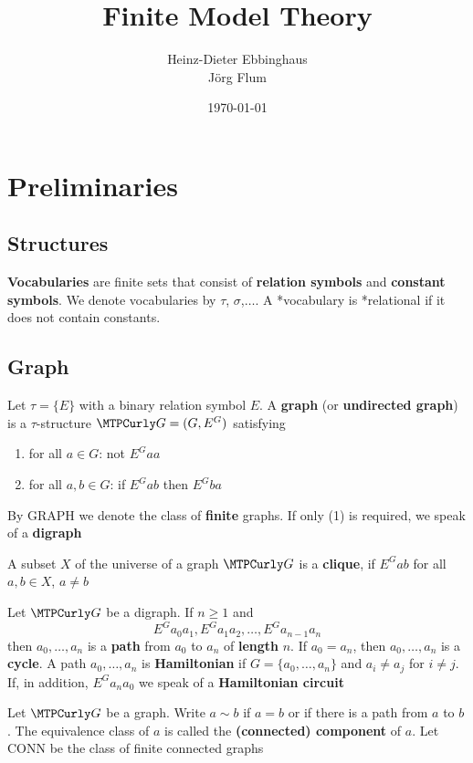 \documentclass[11pt]{article}
\author{Heinz-Dieter Ebbinghaus\\Jörg Flum}
\date{\today}
\title{Finite Model Theory}
\begin{document}
\maketitle
\tableofcontents \clearpage

\section{Preliminaries}
\label{sec:org5835688}

\subsection{Structures}
\label{sec:orgeb2f0cf}
\textbf{Vocabularies} are finite sets that consist of \textbf{relation symbols} and
\textbf{constant symbols}. We denote vocabularies by \(\tau\), \(\sigma\),\(\dots\). A
*vocabulary is *relational if it does not contain constants.


\subsection{Graph}
\label{sec:orge75c1a5}
Let \(\tau=\{E\}\) with a binary relation symbol \(E\). A \textbf{graph} (or
\textbf{undirected graph}) is a \(\tau\)-structure \(\calg=(G,E^G)\) satisfying
\begin{enumerate}
\item for all \(a\in G\): not \(E^Gaa\)
\item for all \(a,b\in G\): if \(E^Gab\) then \(E^Gba\)
\end{enumerate}


By GRAPH we denote the class of \textbf{finite} graphs. If only (1) is required, we
speak of a \textbf{digraph}

A subset \(X\) of the universe of a graph \(\calg\) is a \textbf{clique}, if
\(E^Gab\) for all \(a,b\in X\), \(a\neq b\)


Let \(\calg\) be a digraph. If \(n\ge1\) and
\begin{equation*}
E^Ga_0a_1,E^Ga_1a_2,\dots,E^Ga_{n-1}a_n
\end{equation*}
then \(a_0,\dots,a_n\) is a \textbf{path} from \(a_0\) to \(a_n\) of \textbf{length} \(n\).
If \(a_0=a_n\), then \(a_0,\dots,a_n\) is a \textbf{cycle}. A path \(a_0,\dots,a_n\)
is \textbf{Hamiltonian} if \(G=\{a_0,\dots,a_n\}\) and \(a_i\neq a_j\) for
\(i\neq j\). If, in addition, \(E^Ga_na_0\) we speak of a \textbf{Hamiltonian
circuit}

Let \(\calg\) be a graph. Write \(a\sim b\) if \(a=b\) or if there is a path
from \(a\) to \(b\). The equivalence class of \(a\) is called the
\textbf{(connected) component} of \(a\). Let CONN be the class of finite connected
graphs
\end{document}
